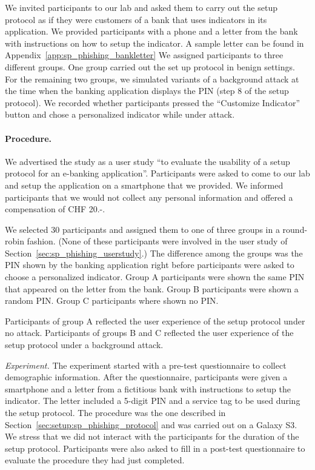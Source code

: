 We invited participants to our lab and asked them to carry out the setup protocol as if they were customers of a bank that uses indicators in its application.
We provided participants with a phone and a letter from the bank with instructions on how to setup the indicator. A sample letter can be found in Appendix~\ref{app:sp_phishing_bankletter}
We assigned participants to three different groups.
One group carried out the set up protocol in benign settings.
For the remaining two groups, we simulated variants of a background attack at the time when the banking application displays the PIN (step 8 of the setup protocol).
We recorded whether participants pressed the ``Customize Indicator'' button and chose a personalized indicator while under attack.


\paragraph{Procedure.}

We advertised the study as a user study ``to evaluate the usability of a setup protocol for an e-banking application''.
Participants were asked to come to our lab and setup the application on a smartphone that we provided.
We informed participants that we would not collect any personal information and offered a compensation of CHF 20.-.

We selected 30 participants and assigned them to one of three groups in a round-robin fashion. (None of these participants were involved in the user study of Section~\ref{sec:sp_phishing_userstudy}.)
The difference among the groups was the PIN shown by the banking application right before participants were asked to choose a personalized indicator.
Group A participants were shown the same PIN that appeared  on the letter from the bank.
Group B participants were shown a random PIN.
Group C participants where shown no PIN.

Participants of group A reflected the user experience of the setup protocol under no attack.
Participants of groups B and C reflected the user experience of the setup protocol under a background attack.


\emph{Experiment.}
The experiment started with a pre-test questionnaire to collect demographic information.
After the questionnaire, participants were given a smartphone and  a letter from a fictitious bank with instructions to setup the indicator.
The letter included a 5-digit PIN and a service tag to be used during the setup protocol.
The procedure was the one described in Section~\ref{sec:setup:sp_phishing_protocol} and was carried out on a Galaxy S3.
We stress that we did not interact with the participants for the duration of the setup protocol.
Participants were also asked to fill in a post-test questionnaire to evaluate the procedure they had just completed.

